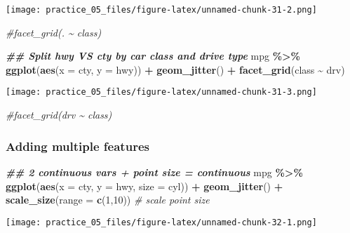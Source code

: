 \documentclass[
]{article}
\newenvironment{Shaded}{\begin{snugshade}}{\end{snugshade}}
\newcommand{\AttributeTok}[1]{\textcolor[rgb]{0.13,0.29,0.53}{#1}}
\newcommand{\CommentTok}[1]{\textcolor[rgb]{0.56,0.35,0.01}{\textit{#1}}}
\newcommand{\DecValTok}[1]{\textcolor[rgb]{0.00,0.00,0.81}{#1}}
\newcommand{\DocumentationTok}[1]{\textcolor[rgb]{0.56,0.35,0.01}{\textbf{\textit{#1}}}}
\newcommand{\FunctionTok}[1]{\textcolor[rgb]{0.13,0.29,0.53}{\textbf{#1}}}
\newcommand{\NormalTok}[1]{#1}
\newcommand{\SpecialCharTok}[1]{\textcolor[rgb]{0.81,0.36,0.00}{\textbf{#1}}}
\begin{document}
\texttt{[image: practice\_05\_files/figure-latex/unnamed-chunk-31-2.png]}

\begin{Shaded}
\begin{Highlighting}[]
  \CommentTok{\#facet\_grid(. \textasciitilde{} class)}
  
\DocumentationTok{\#\# Split hwy VS cty by car class and drive type}
\NormalTok{mpg }\SpecialCharTok{\%\textgreater{}\%} 
  \FunctionTok{ggplot}\NormalTok{(}\FunctionTok{aes}\NormalTok{(}\AttributeTok{x =}\NormalTok{ cty,}
             \AttributeTok{y =}\NormalTok{ hwy)) }\SpecialCharTok{+}
  \FunctionTok{geom\_jitter}\NormalTok{() }\SpecialCharTok{+}
  \FunctionTok{facet\_grid}\NormalTok{(class }\SpecialCharTok{\textasciitilde{}}\NormalTok{ drv)}
\end{Highlighting}
\end{Shaded}

\texttt{[image: practice\_05\_files/figure-latex/unnamed-chunk-31-3.png]}

\begin{Shaded}
\begin{Highlighting}[]
  \CommentTok{\#facet\_grid(drv \textasciitilde{} class)}
\end{Highlighting}
\end{Shaded}

\subsubsection{Adding multiple features}\label{adding-multiple-features}

\begin{Shaded}
\begin{Highlighting}[]
\DocumentationTok{\#\# 2 continuous vars + point size = continuous}
\NormalTok{mpg }\SpecialCharTok{\%\textgreater{}\%} 
  \FunctionTok{ggplot}\NormalTok{(}\FunctionTok{aes}\NormalTok{(}\AttributeTok{x =}\NormalTok{ cty,}
             \AttributeTok{y =}\NormalTok{ hwy,}
             \AttributeTok{size =}\NormalTok{ cyl)) }\SpecialCharTok{+}
  \FunctionTok{geom\_jitter}\NormalTok{() }\SpecialCharTok{+}
  \FunctionTok{scale\_size}\NormalTok{(}\AttributeTok{range =} \FunctionTok{c}\NormalTok{(}\DecValTok{1}\NormalTok{,}\DecValTok{10}\NormalTok{)) }\CommentTok{\# scale point size}
\end{Highlighting}
\end{Shaded}

\texttt{[image: practice\_05\_files/figure-latex/unnamed-chunk-32-1.png]}
\end{document}
